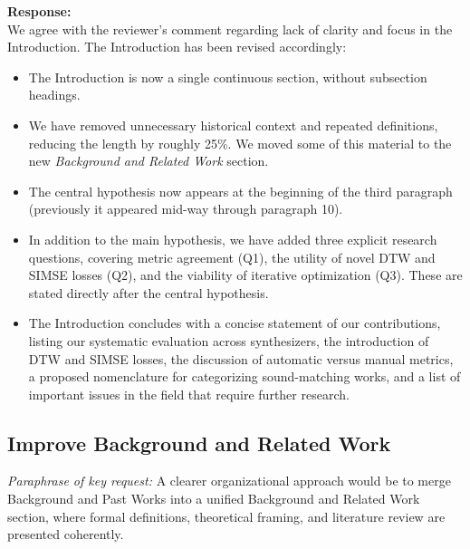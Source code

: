 \documentclass[11pt]{article}
\begin{document}
\noindent\textbf{Response:} \\
We agree with the reviewer’s comment regarding lack of clarity and focus in the Introduction. The Introduction has been revised accordingly: 
\begin{itemize}
  \item The Introduction is now a single continuous section, without subsection headings.  
  \item We have removed unnecessary historical context and repeated definitions, reducing the length by roughly 25\%. We moved some of this material to the new \emph{Background and Related Work} section.  
  \item The central hypothesis now appears at the beginning of the third paragraph (previously it appeared mid-way through paragraph 10).  
  \item In addition to the main hypothesis, we have added three explicit research questions, covering metric agreement (Q1), the utility of novel DTW and SIMSE losses (Q2), and the viability of iterative optimization (Q3).  These are stated directly after the central hypothesis.
  \item The Introduction concludes with a concise statement of our contributions, listing our systematic evaluation across synthesizers, the introduction of DTW and SIMSE losses, the discussion of automatic versus manual metrics, a proposed nomenclature for categorizing sound-matching works, and a list of important issues in the field that require further research.  
\end{itemize}

\subsection*{Improve Background and Related Work}
\noindent\textit{Paraphrase of key request:} A clearer organizational approach would be to merge Background and Past Works into a unified Background and Related Work section, where formal definitions, theoretical framing, and literature review are presented coherently.  
\end{document}
